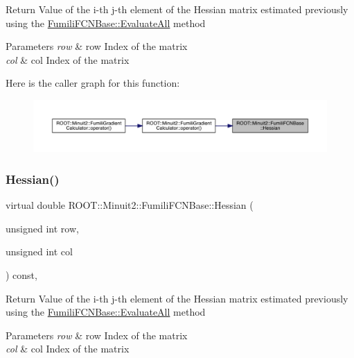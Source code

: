 Return Value of the i-\/th j-\/th element of the Hessian matrix estimated previously using the \mbox{\hyperlink{classROOT_1_1Minuit2_1_1FumiliFCNBase_a0741bb4a7405cc33ab60583472a189cb}{Fumili\+F\+C\+N\+Base\+::\+Evaluate\+All}} method 
\begin{DoxyParams}{Parameters}
{\em row} & row Index of the matrix \\
\hline
{\em col} & col Index of the matrix \\
\hline
\end{DoxyParams}
Here is the caller graph for this function\+:
\nopagebreak
\begin{figure}[H]
\begin{center}
\leavevmode
\includegraphics[width=350pt]{de/dc5/classROOT_1_1Minuit2_1_1FumiliFCNBase_ade134d8c6613393e942ef98d445db376_icgraph}
\end{center}
\end{figure}
\mbox{\label{classROOT_1_1Minuit2_1_1FumiliFCNBase_ade134d8c6613393e942ef98d445db376}} 
\subsubsection{\texorpdfstring{Hessian()}{Hessian()}\hspace{0.1cm}{\footnotesize\ttfamily [2/6]}}
{\footnotesize\ttfamily virtual double R\+O\+O\+T\+::\+Minuit2\+::\+Fumili\+F\+C\+N\+Base\+::\+Hessian (\begin{DoxyParamCaption}\item[{unsigned int}]{row,  }\item[{unsigned int}]{col }\end{DoxyParamCaption}) const\hspace{0.3cm}{\ttfamily [inline]}, {\ttfamily [virtual]}}

Return Value of the i-\/th j-\/th element of the Hessian matrix estimated previously using the \mbox{\hyperlink{classROOT_1_1Minuit2_1_1FumiliFCNBase_a0741bb4a7405cc33ab60583472a189cb}{Fumili\+F\+C\+N\+Base\+::\+Evaluate\+All}} method 
\begin{DoxyParams}{Parameters}
{\em row} & row Index of the matrix \\
\hline
{\em col} & col Index of the matrix \\
\hline
\end{DoxyParams}
\mbox{\label{classROOT_1_1Minuit2_1_1FumiliFCNBase_ade134d8c6613393e942ef98d445db376}} 
